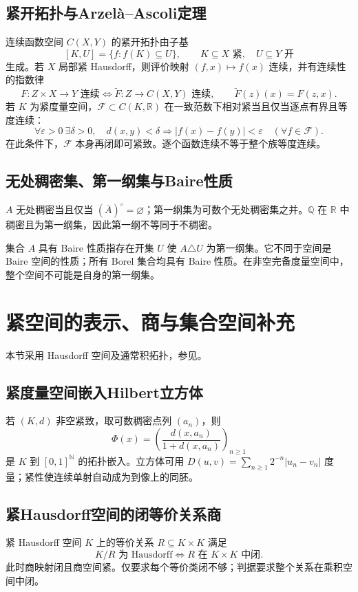 \documentclass[../main.tex]{subfiles}
\begin{document}
\subsection{紧开拓扑与Arzelà--Ascoli定理}
连续函数空间 $C(X,Y)$ 的紧开拓扑由子基
\[
[K,U]=\{f:f(K)\subseteq U\},\qquad K\subseteq X\text{ 紧},\quad U\subseteq Y\text{ 开}
\]
生成。若 $X$ 局部紧 Hausdorff，则评价映射 $(f,x)\mapsto f(x)$ 连续，并有连续性的指数律
\[
F:Z\times X\to Y\text{ 连续}\iff
\widetilde F:Z\to C(X,Y)\text{ 连续},\qquad \widetilde F(z)(x)=F(z,x).
\]
若 $K$ 为紧度量空间，$\mathcal F\subset C(K,\mathbb R)$ 在一致范数下相对紧当且仅当逐点有界且等度连续：
\[
\forall\varepsilon>0\ \exists\delta>0,\quad
d(x,y)<\delta\Longrightarrow |f(x)-f(y)|<\varepsilon\quad(\forall f\in\mathcal F).
\]
在此条件下，$\mathcal F$ 本身再闭即可紧致。逐个函数连续不等于整个族等度连续。

\subsection{无处稠密集、第一纲集与Baire性质}
$A$ 无处稠密当且仅当 $(\overline A)^\circ=\varnothing$；第一纲集为可数个无处稠密集之并。$\mathbb Q$ 在 $\mathbb R$ 中稠密且为第一纲集，因此第一纲不等同于不稠密。

集合 $A$ 具有 Baire 性质指存在开集 $U$ 使 $A\triangle U$ 为第一纲集。它不同于空间是 Baire 空间的性质；所有 Borel 集合均具有 Baire 性质。在非空完备度量空间中，整个空间不可能是自身的第一纲集。
\section{紧空间的表示、商与集合空间补充}
本节采用 Hausdorff 空间及通常积拓扑，参见\cite{topology}。
\subsection{紧度量空间嵌入Hilbert立方体}
若 $(K,d)$ 非空紧致，取可数稠密点列 $(a_n)$，则
\[
\Phi(x)=\left(\frac{d(x,a_n)}{1+d(x,a_n)}\right)_{n\ge1}
\]
是 $K$ 到 $[0,1]^{\mathbb N}$ 的拓扑嵌入。立方体可用 $D(u,v)=\sum_{n\ge1}2^{-n}|u_n-v_n|$ 度量；紧性使连续单射自动成为到像上的同胚。
\subsection{紧Hausdorff空间的闭等价关系商}
紧 Hausdorff 空间 $K$ 上的等价关系 $R\subseteq K\times K$ 满足
\[
K/R\text{ 为 Hausdorff}\iff R\text{ 在 }K\times K\text{ 中闭}.
\]
此时商映射闭且商空间紧。仅要求每个等价类闭不够；判据要求整个关系在乘积空间中闭。
\end{document}

